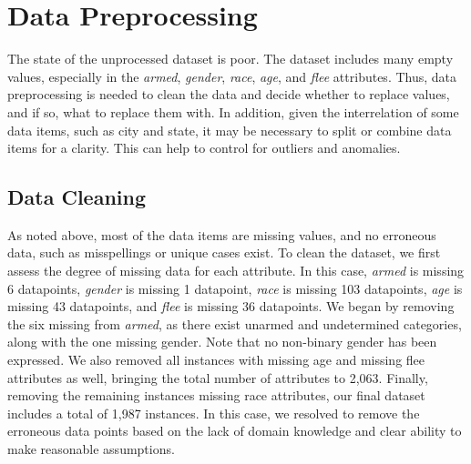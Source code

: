 \documentclass[10pt, conference, compsocconf]{IEEEtran}
\begin{document}
\section{Data Preprocessing}\label{preprocessing}

The state of the unprocessed dataset is poor. The dataset includes many empty values, especially in the \textit{armed}, \textit{gender}, \textit{race}, \textit{age}, and \textit{flee} attributes. Thus, data preprocessing is needed to clean the data and decide whether to replace values, and if so, what to replace them with. In addition, given the interrelation of some data items, such as city and state, it may be necessary to split or combine data items for a clarity. This can help to control for outliers and anomalies. 

\subsection{Data Cleaning}

As noted above, most of the data items are missing values, and no erroneous data, such as misspellings or unique cases exist. To clean the dataset, we first assess the degree of missing data for each attribute. In this case, \textit{armed} is missing 6 datapoints, \textit{gender} is missing 1 datapoint, \textit{race} is missing 103 datapoints, \textit{age} is missing 43 datapoints, and \textit{flee} is missing 36 datapoints. We began by removing the six missing from \textit{armed}, as there exist unarmed and undetermined categories, along with the one missing gender. Note that no non-binary gender has been expressed. We also removed all instances with missing age and missing flee attributes as well, bringing the total number of attributes to 2,063. Finally, removing the remaining instances missing race attributes, our final dataset includes a total of 1,987 instances. In this case, we resolved to remove the erroneous data points based on the lack of domain knowledge and clear ability to make reasonable assumptions.

%
\end{document}

